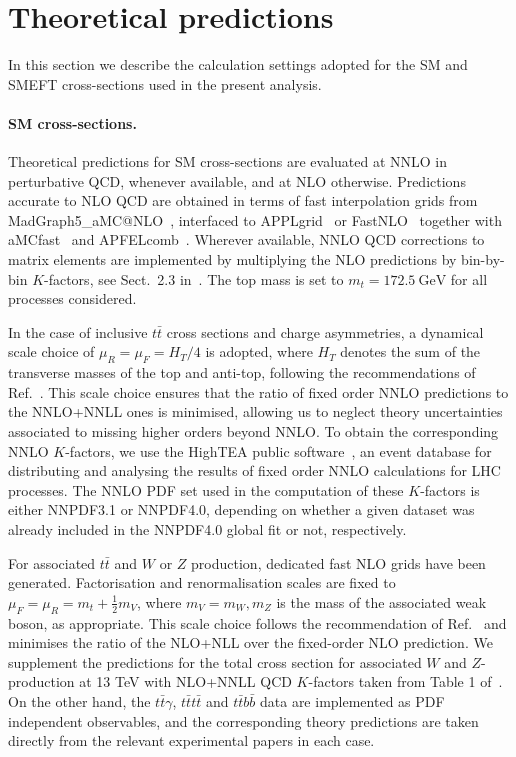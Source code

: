 \documentclass[withindex,glossary]{cam-thesis}
\begin{document}
\section{Theoretical predictions}
\label{sec:theory}

In this section we describe the calculation settings adopted
for the SM and SMEFT cross-sections used in the present analysis.

\paragraph{SM cross-sections.}
%
Theoretical predictions for SM cross-sections are evaluated at NNLO in perturbative QCD, whenever
available, and at NLO otherwise.
%
Predictions accurate to NLO QCD are obtained in terms of fast interpolation grids from {\sc\small MadGraph5\_aMC@NLO}~\cite{Frederix:2018nkq,Alwall:2014hca}, 
interfaced to {\sc\small APPLgrid}~\cite{Carli:2010rw} or {\sc\small FastNLO}~\cite{Kluge:2006xs,Wobisch:2011ij,Britzger:2012bs} together 
with {\sc\small aMCfast}~\cite{Bertone:2014zva} and {\sc\small APFELcomb}~\cite{Bertone:2016lga}.
%
Wherever available, NNLO QCD corrections to matrix elements are  implemented  by multiplying the NLO predictions by bin-by-bin $K$-factors, see Sect.~2.3 in~\cite{Ball:2014uwa}.
%
The top mass is set to $m_t = 172.5\ \text{GeV}$ for all processes considered.

In the case of inclusive $t\bar{t}$ cross sections and charge asymmetries,
a dynamical scale choice of $\mu_R = \mu_F = H_T/4$
is adopted, where $H_T$ denotes the sum of the transverse masses of the top and anti-top,
following the recommendations of Ref.~\cite{Czakon:2016dgf}.
%
This scale choice ensures that
the ratio of fixed order NNLO predictions to the NNLO+NNLL ones is minimised,
allowing us to neglect theory uncertainties associated to missing higher orders beyond NNLO. 
%
To obtain the corresponding
NNLO $K$-factors, we use the {\sc\small HighTEA} public software~\cite{hightea}, 
an event database for distributing and analysing the results of fixed order NNLO
calculations for LHC processes.
%
The NNLO PDF set used in the computation of these $K$-factors is either 
NNPDF3.1 or NNPDF4.0, depending on whether a given dataset was already included
in the NNPDF4.0 global fit or not, respectively.

For associated $t\bar{t}$ and $W$ or $Z$ production, dedicated fast NLO grids  have been generated.
%
Factorisation and renormalisation scales are fixed to $\mu_F = \mu_R = m_t + \frac{1}{2}m_V$, where $m_V = m_W, m_Z$ is the mass of the associated weak boson,
as appropriate.
%
This scale choice follows the recommendation of Ref.~\cite{Kulesza:2018tqz} and minimises the ratio of the NLO+NLL over the fixed-order NLO prediction.
%
We supplement the predictions for the total cross section for associated $W$ and $Z$-production at 13 TeV with NLO+NNLL QCD $K$-factors taken from Table 1 of~\cite{Kulesza:2018tqz}.
%
On the other hand, the $t\bar{t}\gamma$, $t\bar{t}t\bar{t}$ and $t\bar{t}b\bar{b}$ data are implemented as PDF independent observables, and the corresponding theory predictions are taken directly from the relevant experimental papers in each case.
\end{document}
